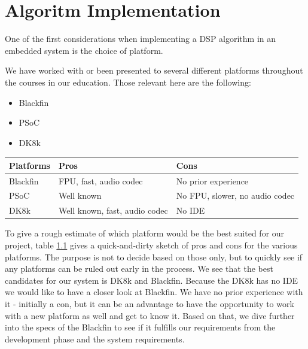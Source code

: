 \chapter{Algoritm Implementation}
One of the first considerations when implementing a DSP algorithm in an embedded system is the choice of platform. 

We have worked with or been presented to several different platforms throughout the courses in our education. Those relevant here are the following:

\begin{itemize}
\item Blackfin
\item PSoC
\item DK8k
\end{itemize}

\begin{table} \label{tab:proscons}
    \begin{tabular}{l|ll}
    Platforms & Pros                          & Cons                           \\ \hline
    Blackfin  & FPU, fast, audio codec        & No prior experience            \\
    PSoC      & Well known                   & No FPU, slower, no audio codec \\
    DK8k      & Well known, fast, audio codec & No IDE                         \\
    \end{tabular}
\end{table}

To give a rough estimate of which platform would be the best suited for our project, table \ref{tab:proscons} gives a quick-and-dirty sketch of pros and cons for the various platforms. The purpose is not to decide based on those only, but to quickly see if any platforms can be ruled out early in the process.
We see that the best candidates for our system is DK8k and Blackfin. Because the DK8k has no IDE we would like to have a closer look at Blackfin. We have no prior experience with it - initially a con, but it can be an advantage to have the opportunity to work with a new platform as well and get to know it.
Based on that, we dive further into the specs of the Blackfin to see if it fulfills our requirements from the development phase and the system requirements.

